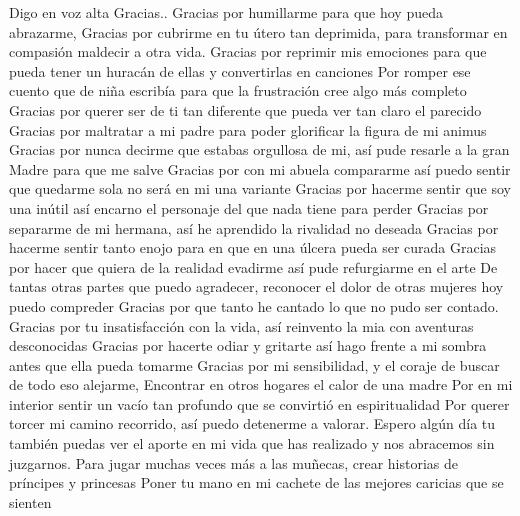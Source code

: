 \documentclass[12pt, a4paper, twoside]{book} %
\begin{document}
Digo en voz alta Gracias..
Gracias por humillarme para que hoy pueda abrazarme,
Gracias por cubrirme en tu útero tan deprimida, para transformar en compasión maldecir a otra vida.
Gracias por reprimir mis emociones para que pueda tener un huracán de ellas y convertirlas en canciones
Por romper ese cuento que de niña escribía para que la frustración cree algo más completo
Gracias por querer ser de ti tan diferente que pueda ver tan claro el parecido
Gracias por maltratar a mi padre para poder glorificar la figura de mi animus
Gracias por nunca decirme que estabas orgullosa de mi, así pude resarle a la gran Madre para que me salve
Gracias por con mi abuela compararme así puedo sentir que quedarme sola no será en mi una variante
Gracias por hacerme sentir que soy una inútil así encarno el personaje del que nada tiene para perder
Gracias por separarme de mi hermana, así he aprendido la rivalidad no deseada
Gracias por hacerme sentir tanto enojo para en que en una úlcera pueda ser curada
Gracias por hacer que quiera de la realidad evadirme  así pude refurgiarme en el arte
De tantas otras partes que puedo agradecer, reconocer el dolor de otras mujeres hoy puedo compreder
Gracias por que tanto he cantado lo que no pudo ser contado.
Gracias por tu insatisfacción con la vida, así reinvento la mia con aventuras desconocidas
Gracias por hacerte odiar y gritarte así hago frente a mi sombra antes que ella pueda tomarme
Gracias  por mi sensibilidad, y el coraje de buscar de todo eso alejarme,
Encontrar en otros hogares el calor de una madre
Por en mi interior  sentir un vacío tan profundo que  se convirtió en espiritualidad
Por querer torcer mi camino recorrido, así puedo detenerme a valorar.
Espero algún día tu también puedas ver el aporte en mi vida que has realizado y nos abracemos sin juzgarnos.
Para jugar muchas veces más a las muñecas, crear historias de príncipes y princesas
Poner tu mano en mi cachete de las mejores caricias que se sienten
\end{document}
